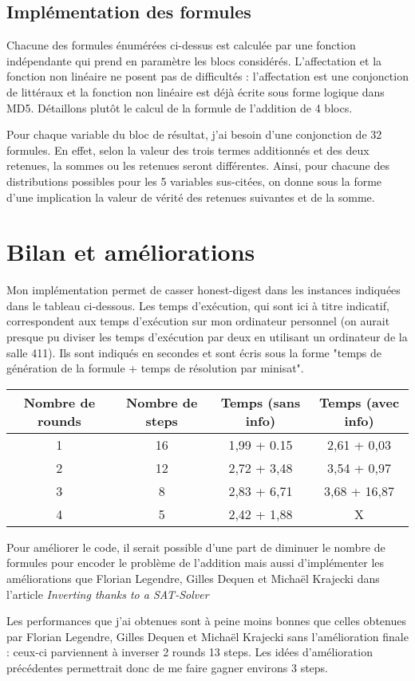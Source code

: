 \documentclass{article}
\begin{document}
\subsection{Implémentation des formules}
Chacune des formules énumérées ci-dessus est calculée par une fonction indépendante qui prend en paramètre les blocs considérés. L'affectation et la fonction non linéaire ne posent pas de difficultés : l'affectation est une conjonction de littéraux et la fonction non linéaire est déjà écrite sous forme logique dans MD5. Détaillons plutôt le calcul de la formule de l'addition de 4 blocs. 
\par
Pour chaque variable du bloc de résultat, j'ai besoin d'une conjonction de 32 formules. En effet, selon la valeur des trois termes additionnés et des deux retenues, la sommes ou les retenues seront différentes. Ainsi, pour chacune des distributions possibles pour les 5 variables sus-citées, on donne sous la forme d'une implication la valeur de vérité des retenues suivantes et de la somme.

\section{Bilan et améliorations}
Mon implémentation permet de casser honest-digest dans les instances indiquées dans le tableau ci-dessous. Les temps d'exécution, qui sont ici à titre indicatif, correspondent aux temps d'exécution sur mon ordinateur personnel (on aurait presque pu diviser les temps d'exécution par deux en utilisant un ordinateur de la salle 411). Ils sont indiqués en secondes et sont écris sous la forme "temps de génération de la formule + temps de résolution par minisat".
\par

\vspace{0.4cm}
\begin{tabular}{|c|c|c|c|}
   \hline
   	Nombre de rounds & Nombre de steps & Temps (sans info) & Temps (avec info) \\
   \hline
   1 & 16 & 1,99 + 0.15 & 2,61 + 0,03 \\
   \hline
   2 & 12 & 2,72 + 3,48 & 3,54 + 0,97 \\
   \hline
   3 & 8 & 2,83 + 6,71 & 3,68 + 16,87\\
   \hline
   4 & 5 & 2,42 + 1,88 &  X\\
   \hline
\end{tabular} 
\vspace{0.4cm}

Pour améliorer le code, il serait possible d'une part de diminuer le nombre de formules pour encoder le problème de l'addition mais aussi d'implémenter les améliorations que Florian Legendre, Gilles Dequen et Michaël Krajecki dans l'article \textit{Inverting thanks to a SAT-Solver}

Les performances que j'ai obtenues sont à peine moins bonnes que celles obtenues par Florian Legendre, Gilles Dequen et Michaël Krajecki sans l'amélioration finale : ceux-ci parviennent à inverser 2 rounds 13 steps. Les idées d'amélioration précédentes permettrait donc de me faire gagner environs 3 steps.
\end{document}
